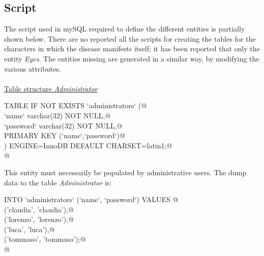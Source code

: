 \documentclass[a4paper]{report}
\begin{document}
\subsection{Script}
The script used in mySQL required to define the different entities is partially shown below. There are no reported all the scripts for creating the tables for the characters in which the disease manifests itself; it has been reported that only the entity \textit{Eyes}. The entities missing are generated in a similar way, by modifying the various attributes. \\ \\
\underline{Table structure \textit{Administrator}}
\begin{flushleft} \small \label{scrap1}
\begin{list}{}{} \item
\mbox{}\verb@CREATE TABLE IF NOT EXISTS `administrators` (@\\
\mbox{}\verb@  `name` varchar(32) NOT NULL,@\\
\mbox{}\verb@  `password` varchar(32) NOT NULL,@\\
\mbox{}\verb@  PRIMARY KEY (`name`,`password`)@\\
\mbox{}\verb@) ENGINE=InnoDB DEFAULT CHARSET=latin1;@\\
\mbox{}\verb@ @\\
\end{list}
\vspace{-1ex}
\footnotesize\addtolength{\baselineskip}{-1ex}
\end{flushleft}
This entity must necessarily be populated by administrative users. The dump data to the table \textit{Administrator} is:
\begin{flushleft} \small \label{scrap1}
\begin{list}{}{} \item
\mbox{}\verb@INSERT INTO `administrators` (`name`, `password`) VALUES @\\
\mbox{}\verb@('claudia', 'claudia'),@\\
\mbox{}\verb@('lorenzo', 'lorenzo'),@\\
\mbox{}\verb@('luca', 'luca'),@\\
\mbox{}\verb@('tommaso', 'tommaso');@\\
\mbox{}\verb@ @\\
\end{list}
\vspace{-1ex}
\footnotesize\addtolength{\baselineskip}{-1ex}
\end{flushleft}
\end{document}
